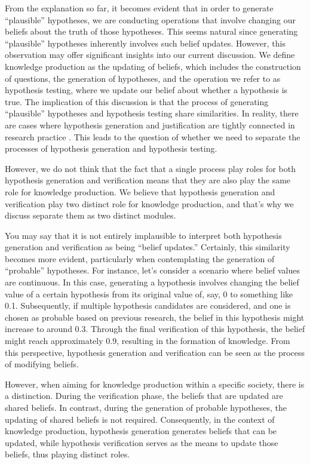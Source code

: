\documentclass{book}
\begin{document}
From the explanation so far, it becomes evident that in order to generate ``plausible'' hypotheses, we are conducting operations that involve changing our beliefs about the truth of those hypotheses. This seems natural since generating ``plausible'' hypotheses inherently involves such belief updates. However, this observation may offer significant insights into our current discussion. We define knowledge production as the updating of beliefs, which includes the construction of questions, the generation of hypotheses, and the operation we refer to as hypothesis testing, where we update our belief about whether a hypothesis is true. The implication of this discussion is that the process of generating ``plausible'' hypotheses and hypothesis testing share similarities. In reality, there are cases where hypothesis generation and justification are tightly connected in research practice \cite{arabatzis2006inextricability}. This leads to the question of whether we need to separate the processes of hypothesis generation and hypothesis testing.

However, we do not think that the fact that a single process play roles for both hypothesis generation and verification means that they are also play the same role for knowledge production. We believe that hypothesis generation and verification play two distinct role for knowledge production, and that's why we discuss separate them as two distinct modules.

You may say that it is not entirely implausible to interpret both hypothesis generation and verification as being ``belief updates.'' Certainly, this similarity becomes more evident, particularly when contemplating the generation of ``probable'' hypotheses. For instance, let's consider a scenario where belief values are continuous. In this case, generating a hypothesis involves changing the belief value of a certain hypothesis from its original value of, say, 0 to something like 0.1. Subsequently, if multiple hypothesis candidates are considered, and one is chosen as probable based on previous research, the belief in this hypothesis might increase to around 0.3. Through the final verification of this hypothesis, the belief might reach approximately 0.9, resulting in the formation of knowledge. From this perspective, hypothesis generation and verification can be seen as the process of modifying beliefs.

However, when aiming for knowledge production within a specific society, there is a distinction. During the verification phase, the beliefs that are updated are shared beliefs. In contrast, during the generation of probable hypotheses, the updating of shared beliefs is not required. Consequently, in the context of knowledge production, hypothesis generation generates beliefs that can be updated, while hypothesis verification serves as the means to update those beliefs, thus playing distinct roles.
\end{document}
